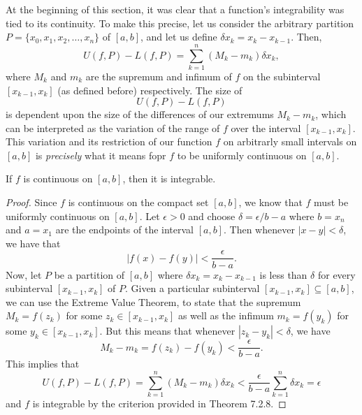At the beginning of this section, it was clear that a function's integrability was tied to its continuity. To make this precise, let us consider the arbitrary partition \( P = \{ x_{0}, x_{1}, x_{2}, \dots, x_{n} \}  \) of \( [a,b]  \), and let us define \( \delta x_{k } = x_{k } - x_{k-1 } \). Then, 
\[  U(f,P) - L(f,P) = \sum_{ k=1 }^{ n } (M_{k } - m_{k } ) \delta x_{ k }, \]
where \( M _{k }  \) and \( m_{ k }  \) are the supremum and infimum of \( f  \) on the subinterval \( [x_{k -1 } , x_{ k  }] \) (as defined before) respectively. The size of 
\[  U(f,P) - L(f,P)   \] is dependent upon the size of the differences of our extremums \(  M_{k } - m_{k } \), which can be interpreted as the variation of the range of \( f  \) over the interval \( [x_{k-1 }, x_{k }] \). This variation and its restriction of our function \( f  \) on arbitrarly small intervals on \( [a,b]  \) is \textit{precisely} what it means fopr \( f  \) to be uniformly continuous on \( [a,b] \).

\begin{tcolorbox}
\begin{thm}
	If \( f  \) is continuous on \( [a,b] \), then it is integrable.
\end{thm}
\end{tcolorbox}

\begin{proof}
	Since \( f  \) is continuous on the compact set \( [a,b]  \), we know that \( f  \) must be uniformly continuous on \( [a,b]  \). Let \( \epsilon > 0  \) and choose \( \delta = \epsilon / b -a  \) where \( b = x_{n}   \) and \( a = x_{1}  \) are the endpoints of the interval \( [a,b ] \). Then whenever \( | x - y  | < \delta  \), we have that 
	\[  | f(x) - f(y)  | < \frac{ \epsilon  }{  b - a  }. \]
	Now, let \( P  \) be a partition of \( [a,b]  \) where \( \delta x_{ k } = x_{ k } - x _{ k -1 } \) is less than \( \delta  \) for every subinterval \( [x_{k-1 } , x_{k }] \) of \( P  \). Given a particular subinterval \( [x_{k-1}, x_{ k } ] \subseteq [a,b]   \), we can use the Extreme Value Theorem, to state that the supremum \(  M_{k} = f(z_{k })  \) for some \( z_{k } \in [x_{ k-1 } , x_{k}]  \) as well as the infimum \( m_{k } = f(y_{k }) \) for some \( y_{ k } \in [x_{k -1 } , x_{ k }]  \). But this means that whenever \( | z_{k } - y_{k } | < \delta  \), we have 
	\[  M_{k } - m_{k } = f(z_{k}) - f(y_{k } ) < \frac{ \epsilon  }{  b -a  }. \]
	This implies that 
	\[  U(f, P ) - L(f,P ) = \sum_{ k=1 }^{ n } (M_{k } - m_{ k } ) \delta x_{k} < \frac{ \epsilon  }{ b -a  }  \sum_{ k=1 }^{ n } \delta x_{k} = \epsilon \]
	and \( f  \) is integrable by the criterion provided in Theorem 7.2.8.
\end{proof}



